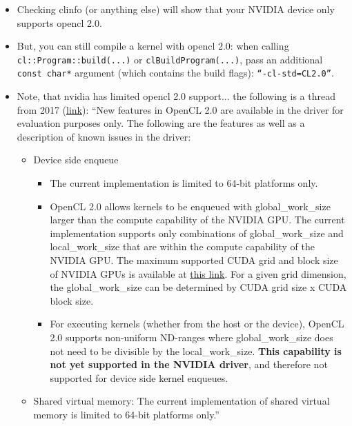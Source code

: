 \documentclass[a4paper]{article}
\begin{document}
\begin{itemize}
\item Checking clinfo (or anything else) will show that your NVIDIA device only supports
  opencl 2.0.
\item But, you can still compile a kernel with opencl 2.0: when
  calling \texttt{cl::Program::build(...)} or \texttt{clBuildProgram(...)}, pass an additional
  \texttt{const char*} argument (which contains the build flags):
  \texttt{``-cl-std=CL2.0''}.
\item Note, that nvidia has limited opencl 2.0 support... the
  following is a thread from 2017 (\href{https://streamhpc.com/blog/2017-02-22/nvidia-enables-opencl-2-0-beta-support/}{link}): \newline
  ``New features in OpenCL 2.0 are available in the driver for evaluation purposes only. The following are the features as well as a description of known issues in the driver:
  \begin{itemize}
  \item Device side enqueue
    \begin{itemize}
    \item The current implementation is limited to 64-bit platforms only.
    \item OpenCL 2.0 allows kernels to be enqueued with
      global\_work\_size larger than the compute capability of the
      NVIDIA GPU. The current implementation supports only
      combinations of global\_work\_size and local\_work\_size that are
      within the compute capability of the NVIDIA GPU. The maximum
      supported CUDA grid and block size of NVIDIA GPUs is available
      at
      \href{http://docs.nvidia.com/cuda/cuda-c-programming-guide/index.html#computecapabilities}{this link}. For
      a given grid dimension, the global\_work\_size can be determined
      by CUDA grid size x CUDA block size.
    \item For executing kernels (whether from the host or the
      device), OpenCL 2.0 supports non-uniform ND-ranges where
      global\_work\_size does not need to be divisible by the
      local\_work\_size. \textbf{This capability is not yet supported in the
        NVIDIA driver}, and therefore not supported for device side
      kernel enqueues.
    \end{itemize}
  \item Shared virtual memory: The current implementation of shared
    virtual memory is limited to 64-bit platforms only.''
  \end{itemize}
\end{itemize}
\end{document}

